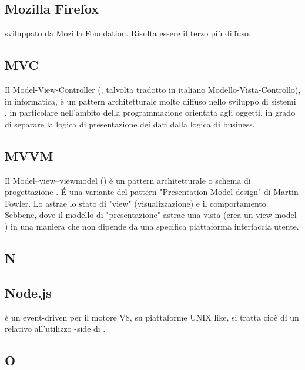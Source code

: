 \subsection*{Mozilla Firefox}
   sviluppato da Mozilla Foundation. Risulta essere il terzo
 più diffuso.

\subsection*{MVC}
Il Model-View-Controller (, talvolta tradotto in italiano Modello-Vista-Controllo), in informatica, è un pattern architetturale molto diffuso nello sviluppo di sistemi , in particolare nell'ambito della programmazione orientata agli oggetti, in grado di separare la logica di presentazione dei dati dalla logica di business.

\subsection*{MVVM}
Il Model–view–viewmodel () è un pattern  architetturale o schema di progettazione . É una variante del pattern "Presentation Model design" di Martin Fowler. Lo  astrae lo stato di "view" (visualizzazione) e il comportamento. Sebbene, dove il modello di "presentazione" astrae una vista (crea un view model ) in una maniera che non dipende da una specifica piattaforma interfaccia utente.

\newpage

\begin{center}
\Huge\section*{\uppercase{N}}
\end{center}

\subsection*{Node.js}
 è un  event-driven per il motore  V8, su piattaforme UNIX
like, si tratta cioè di un  relativo all'utilizzo -side di .

\newpage

\begin{center}
\Huge\section*{\uppercase{O}}
\end{center}

